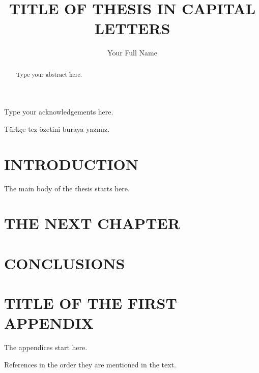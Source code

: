 \documentclass[12pt]{report}
\title{TITLE OF THESIS IN CAPITAL LETTERS}
\author{Your Full Name}
\begin{document}
%
\makemstitle        %

\makeapprovalpage

\begin{acknowledgements}
Type your acknowledgements here.
\end{acknowledgements}

\begin{abstract}
Type your abstract here.
\end{abstract}
%
%
\begin{ozet}
T\"urk\c ce tez \"ozetini buraya yaz\i n\i z.
\end{ozet}

\tableofcontents
\listoffigures
\listoftables

\begin{symabbreviations}
%
\sym{}{}       %
\end{symabbreviations}

\chapter{INTRODUCTION}
The main body of the thesis starts here.

\chapter{THE NEXT CHAPTER}
%
%
\chapter{CONCLUSIONS}

\appendix      %
\chapter{TITLE OF THE FIRST APPENDIX}
The appendices start here.

\begin{thebibliography}{9}
 References in the order they are mentioned in the text.
\end{thebibliography}
%
%
\end{document}
